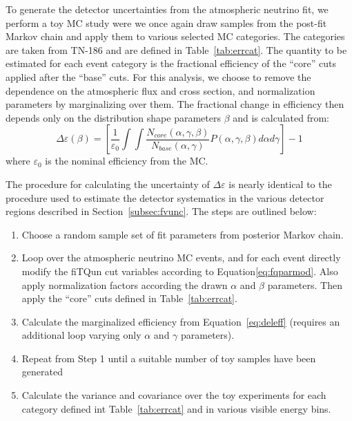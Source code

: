 To generate the detector uncertainties from the atmospheric neutrino fit, we
perform a toy MC study were we once again draw samples from the post-fit Markov
chain and apply them to various selected MC categories.  The categories are
taken from TN-186 and are defined in Table~\ref{tab:errcat}. The quantity to
be estimated for each event category is the fractional efficiency of the ``core''
cuts applied after the ``base'' cuts.  For this analysis, we choose to remove the 
dependence on the atmospheric flux and cross section, and normalization parameters by 
marginalizing over them.  The fractional change in efficiency then depends only
on the distribution shape parameters $\beta$ and is calculated from:
%
\begin{equation}
  \label{eq:deleff}
  \Delta \varepsilon(\beta) = \left[ \frac{1}{\varepsilon_{0}}
  \int\int\frac{N_{core}(\alpha,\gamma,\beta)}{N_{base}(\alpha,\gamma)}
  P(\alpha,\gamma,\beta)d\alpha d\gamma \right] - 1
\end{equation}
%
where $\varepsilon_{0}$ is the nominal efficiency from the MC.

The procedure for calculating the uncertainty of $\Delta \varepsilon$ is nearly
identical to the procedure used to estimate the detector systematics in the various
detector regions described in Section~\ref{subsec:fvunc}. The steps are outlined
below:

\begin{enumerate}
  \item Choose a random sample set of fit parameters from posterior Markov chain.
  \item Loop over the atmospheric neutrino MC events, and for each event directly modify the fiTQun cut variables
    according to Equation\ref{eq:fqparmod}. Also apply normalization factors according the drawn $\alpha$ and
    $\beta$ parameters.  Then apply the ``core'' cuts defined in Table~\ref{tab:errcat}.
  \item Calculate the marginalized efficiency from Equation~\ref{eq:deleff} (requires an additional
    loop varying only $\alpha$ and $\gamma$ parameters).
  \item Repeat from Step 1 until a suitable number of toy samples have been generated
  \item Calculate the variance and covariance over the toy experiments for each category defined
    int Table~\ref{tab:errcat} and in various visible energy bins.
\end{enumerate}

